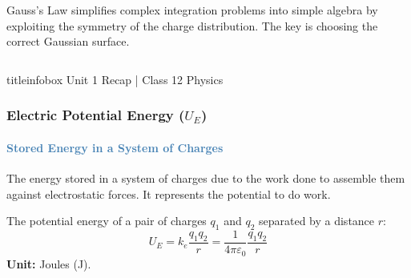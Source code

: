 \begin{frame}
\begin{frame}
\begin{columns}[T]
    \vspace{0.3cm}
    
    \begin{importantbox}
    \vspace{0.1cm}
    Gauss's Law simplifies complex integration problems into simple algebra by exploiting the symmetry of the charge distribution. The key is choosing the correct Gaussian surface.
    \vspace{0.1cm}
    \end{importantbox}
    
\end{columns}

\vfill

\begin{beamercolorbox}[wd=\textwidth,ht=0.5cm,dp=0.1cm,center]{titleinfobox}
    \small\color{coolgray} Unit 1 Recap | Class 12 Physics
\end{beamercolorbox}
\end{frame}

\begin{frame}
\frametitle{\textsf{\textbf{Electric Potential Energy ($U_E$)}}}
\framesubtitle{\textcolor{steelblue}{Stored Energy in a System of Charges}}

\vspace{-0.05cm}

\begin{keybox}
\vspace{0.1cm}
The energy stored in a system of charges due to the work done to assemble them against electrostatic forces. It represents the potential to do work.
\vspace{0.1cm}
\end{keybox}

\vspace{0.35cm}

\begin{formulabox}
\vspace{0.1cm}
The potential energy of a pair of charges $q_1$ and $q_2$ separated by a distance $r$:
\begin{equation*}
\boxed{U_E = k_e \frac{q_1 q_2}{r} = \frac{1}{4\pi\varepsilon_0} \frac{q_1 q_2}{r}}
\end{equation*}
\textbf{Unit:} Joules (J).
\vspace{0.1cm}
\end{formulabox}


\end{frame}
\end{frame}
